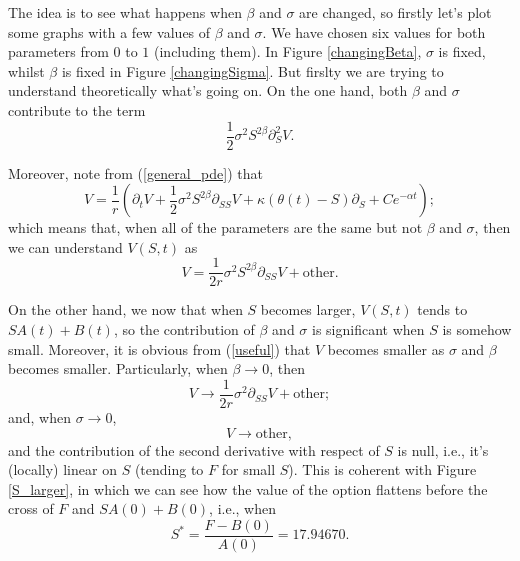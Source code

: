 \vspace{-0.3cm}
The idea is to see what happens when $\beta$ and $\sigma$ are changed, so firstly let's plot some graphs with a few values of $\beta$ and $\sigma$. We have chosen six values for both parameters from $0$ to $1$ (including them). In Figure \ref{changingBeta}, $\sigma$ is fixed, whilst $\beta$ is fixed in Figure \ref{changingSigma}. But firslty we are trying to understand theoretically what's going on. On the one hand, both $\beta$  and $\sigma$ contribute to the term 
\begin{equation}
	\frac{1}{2}\sigma^2S^{2\beta}\partial_S^2 V.
\end{equation}

Moreover, note from (\ref{general_pde}) that
\begin{equation}
	V = \frac{1}{r}\left(\partial_t V + \frac{1}{2}\sigma^2 S^{2\beta}\partial_{SS} V + \kappa\left(\theta(t) - S\right)\partial_S + Ce^{-\alpha t}\right);
\end{equation}
which means that, when all of the parameters are the same but not $\beta$ and $\sigma$, then we can understand $V(S,t)$ as
\begin{equation}\label{useful}
	V = \frac{1}{2r}\sigma^2 S^{2\beta}\partial_{SS} V + \text{other}.
\end{equation}

On the other hand, we now that when $S$ becomes larger, $V(S,t)$ tends to $S A(t) + B(t)$, so the contribution of $\beta$ and $\sigma$ is significant when $S$ is somehow small. Moreover, it is obvious from (\ref{useful}) that $V$ becomes smaller as $\sigma$ and $\beta$ becomes smaller. Particularly, when $\beta \to 0$, then
\begin{equation}
	V \to  \frac{1}{2r}\sigma^2\partial_{SS} V + \text{other};
\end{equation}
and, when $\sigma\to 0$, 
\begin{equation}
	V \to  \text{other},
\end{equation}
and the contribution of the second derivative with respect of $S$ is null, i.e., it's (locally) linear on $S$ (tending to $F$ for small $S$). This is coherent with Figure \ref{S_larger}, in which we can see how the value of the option flattens before the cross of $F$ and $S A(0) + B(0)$, i.e., when
\begin{equation}
	S^* = \frac{F-B(0)}{A(0)} = 17.94670.
\end{equation} 

